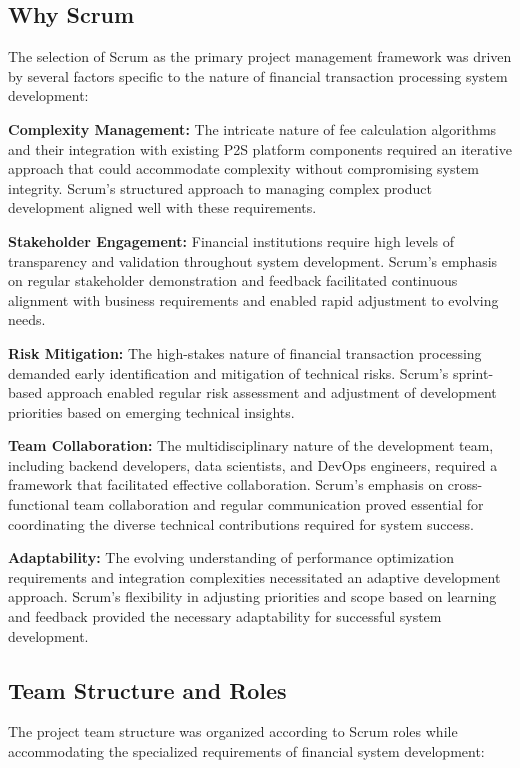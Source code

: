 \subsection{Why Scrum}

The selection of Scrum as the primary project management framework was driven by several factors specific to the nature of financial transaction processing system development:

\textbf{Complexity Management:} The intricate nature of fee calculation algorithms and their integration with existing P2S platform components required an iterative approach that could accommodate complexity without compromising system integrity. Scrum's structured approach to managing complex product development aligned well with these requirements.

\textbf{Stakeholder Engagement:} Financial institutions require high levels of transparency and validation throughout system development. Scrum's emphasis on regular stakeholder demonstration and feedback facilitated continuous alignment with business requirements and enabled rapid adjustment to evolving needs.

\textbf{Risk Mitigation:} The high-stakes nature of financial transaction processing demanded early identification and mitigation of technical risks. Scrum's sprint-based approach enabled regular risk assessment and adjustment of development priorities based on emerging technical insights.

\textbf{Team Collaboration:} The multidisciplinary nature of the development team, including backend developers, data scientists, and DevOps engineers, required a framework that facilitated effective collaboration. Scrum's emphasis on cross-functional team collaboration and regular communication proved essential for coordinating the diverse technical contributions required for system success.

\textbf{Adaptability:} The evolving understanding of performance optimization requirements and integration complexities necessitated an adaptive development approach. Scrum's flexibility in adjusting priorities and scope based on learning and feedback provided the necessary adaptability for successful system development.

\subsection{Team Structure and Roles}

The project team structure was organized according to Scrum roles while accommodating the specialized requirements of financial system development:

